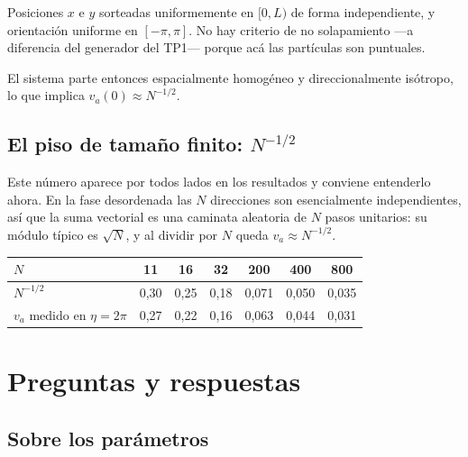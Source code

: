 \documentclass[11pt]{article}
\begin{document}
Posiciones $x$ e $y$ sorteadas uniformemente en $[0, L)$ de forma independiente,
y orientación uniforme en $[-\pi, \pi]$. No hay criterio de no solapamiento
---a diferencia del generador del TP1--- porque acá las partículas son
puntuales.

El sistema parte entonces espacialmente homogéneo y direccionalmente isótropo,
lo que implica $v_a(0) \approx N^{-1/2}$.

\subsection{El piso de tamaño finito: $N^{-1/2}$}

Este número aparece por todos lados en los resultados y conviene entenderlo
ahora. En la fase desordenada las $N$ direcciones son esencialmente
independientes, así que la suma vectorial es una caminata aleatoria de $N$ pasos
unitarios: su módulo típico es $\sqrt{N}$, y al dividir por $N$ queda
$v_a \approx N^{-1/2}$.

\begin{center}
\begin{tabular}{lcccccc}
\toprule
$N$ & 11 & 16 & 32 & 200 & 400 & 800 \\
\midrule
$N^{-1/2}$ & 0{,}30 & 0{,}25 & 0{,}18 & 0{,}071 & 0{,}050 & 0{,}035 \\
$v_a$ medido en $\eta = 2\pi$ & 0{,}27 & 0{,}22 & 0{,}16 & 0{,}063 & 0{,}044 & 0{,}031 \\
\bottomrule
\end{tabular}
\end{center}


\section{Preguntas y respuestas}

\subsection{Sobre los parámetros}

\end{document}
